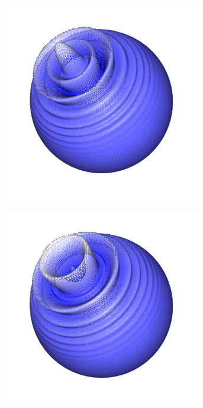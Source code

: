\documentclass[crop=false]{standalone}
\begin{document}
\begin{figure}
\begin{subfigure}[b]{0.24\textwidth}
        \caption{}
      \end{subfigure}
      \begin{subfigure}[b]{0.24\textwidth}
        \center
        \includegraphics[trim={2.12cm 2.33cm 2.2cm 0cm},clip,width=0.95\textwidth]{images/sphere_wave_2.png}
        \caption{}
      \end{subfigure}
      \begin{subfigure}[b]{0.24\textwidth}
        \center
        \includegraphics[trim={2.12cm 2.33cm 2.2cm 0cm},clip,width=0.95\textwidth]{images/sphere_wave_3.png}
        \caption{}
      \end{subfigure}


\end{figure}
\end{document}
